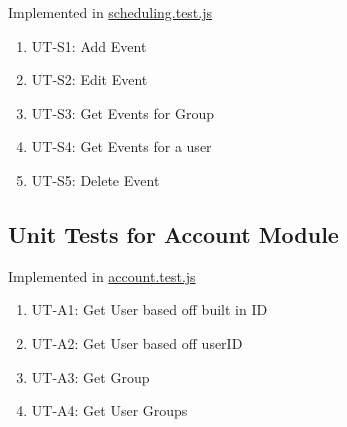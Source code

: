 \documentclass[12pt, titlepage]{article}
\begin{document}
Implemented in \href{https://github.com/DangJustin/CapstoneProject/blob/main/src/rev0_demo/server/tests/scheduling.test.js}{scheduling.test.js}

\begin{enumerate}
    \item UT-S1: Add Event
    \item UT-S2: Edit Event
    \item UT-S3: Get Events for Group
    \item UT-S4: Get Events for a user
    \item UT-S5: Delete Event
\end{enumerate}


\subsection{Unit Tests for Account Module}

Implemented in \href{https://github.com/DangJustin/CapstoneProject/blob/main/src/rev0_demo/server/tests/account.test.js}{account.test.js}

\begin{enumerate}
    \item UT-A1: Get User based off built in ID
    \item UT-A2: Get User based off userID
    \item UT-A3: Get Group
    \item UT-A4: Get User Groups
\end{enumerate}






\end{document}

